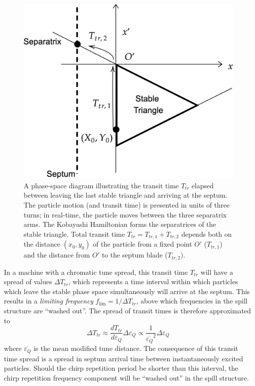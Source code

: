 \documentclass[a4paper,twoside,11pt]{report}
\begin{document}
\begin{figure}
  \centering
  \includegraphics*[width=0.6\linewidth]{transit-time-phase-space.png}
  \caption[Phase-space diagram of extracted particle transit time]{A phase-space diagram illustrating the transit time $T_{tr}$ elapsed between leaving the last stable triangle and arriving at the septum. The particle motion (and transit time) is presented in units of three turns; in real-time, the particle moves between the three separatrix arms. The Kobayashi Hamiltonian forms the separatrices of the stable triangle. Total transit time $T_{tr}=T_{tr,1} + T_{tr,2}$ depends both on the distance $(x_0, y_0)$ of the particle from a fixed point $O'$ ($T_{tr,1}$) and the distance from $O'$ to the septum blade ($T_{tr,2}$).}\label{fig:transit_time}
\end{figure}

In a machine with a chromatic tune spread, this transit time $T_{tr}$ will have a spread of values $\Delta T_{tr}$, which represents a time interval within which particles which leave the stable phase space simultaneously will arrive at the septum. This results in a \textit{limiting frequency} $f_{\lim}=1/\Delta T_{tr}$, above which frequencies in the spill structure are ``washed out''. 
The spread of transit times is therefore approximated to~\cite{PhysRevApplied.13.044076, Pullia:313678}
\begin{equation}
  \Delta T_{tr}\approx\frac{dT_{tr}}{d{\varepsilon_Q}}\Delta{\varepsilon_Q}\propto\frac 1{\overline{\varepsilon_Q}^2}\Delta\varepsilon_Q
\end{equation} where $\overline{\varepsilon_Q}$ is the mean modified tune distance. 
The consequence of this transit time spread is a spread in septum arrival time between instantaneously excited particles. Should the chirp repetition period be shorter than this interval, the chirp repetition frequency component will be ``washed out'' in the spill structure.
\end{document}
